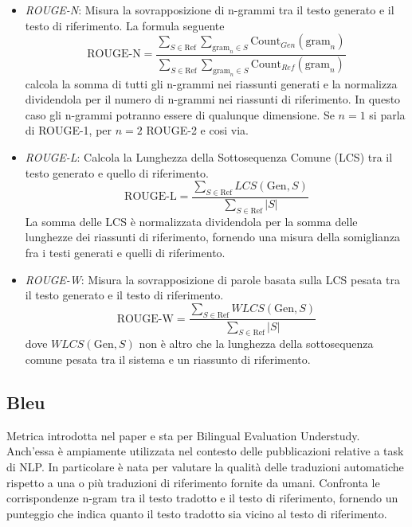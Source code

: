 \documentclass[12pt,a4paper,twoside,openright]{book}
\begin{document}
\begin{itemize}
    \item \emph{ROUGE-N}: Misura la sovrapposizione di n-grammi tra il testo generato e il testo di riferimento. La formula seguente
    \begin{equation*}
        \text{ROUGE-N} = \frac{\sum_{S \in \text{Ref}} \sum_{\text{gram}_n \in S} \text{Count}_{Gen}(\text{gram}_n)} {\sum_{S \in \text{Ref}} \sum_{\text{gram}_n \in S} \text{Count}_{Ref}(\text{gram}_n)}
    \end{equation*}
    calcola la somma di tutti gli n-grammi nei riassunti generati e la normalizza dividendola per il numero di n-grammi nei riassunti di riferimento. In questo caso gli n-grammi potranno essere di qualunque dimensione. Se $n=1$ si parla di ROUGE-1, per $n=2$ ROUGE-2 e cosi via.
    \item \emph{ROUGE-L}: Calcola la Lunghezza della Sottosequenza Comune (LCS) tra il testo generato e quello di riferimento.
    \begin{equation*}
        \text{ROUGE-L} = \frac{\sum_{S \in \text{Ref}} LCS(\text{Gen}, S)}{\sum_{S \in \text{Ref}} \vert S \vert}
    \end{equation*}
    La somma delle LCS è normalizzata dividendola per la somma delle lunghezze dei riassunti di riferimento, fornendo una misura della somiglianza fra i testi generati e quelli di riferimento.
    \item \emph{ROUGE-W}: Misura la sovrapposizione di parole basata sulla LCS pesata tra il testo generato e il testo di riferimento.
    \begin{equation*}
        \text{ROUGE-W} = \frac{\sum_{S \in \text{Ref}} WLCS(\text{Gen}, S)}{\sum_{S \in \text{Ref}} \vert S \vert}
    \end{equation*}
    dove $WLCS(\text{Gen}, S)$ non è altro che la lunghezza della sottosequenza comune pesata tra il sistema e un riassunto di riferimento.
\end{itemize}

\subsection{Bleu}
Metrica introdotta nel paper \cite{papineni-etal-2002-bleu} e sta per Bilingual Evaluation Understudy. Anch'essa è ampiamente utilizzata nel contesto delle pubblicazioni relative a task di NLP. In particolare è nata per valutare la qualità delle traduzioni automatiche rispetto a una o più traduzioni di riferimento fornite da umani.
Confronta le corrispondenze n-gram tra il testo tradotto e il testo di riferimento, fornendo un punteggio che indica quanto il testo tradotto sia vicino al testo di riferimento.
\end{document}
